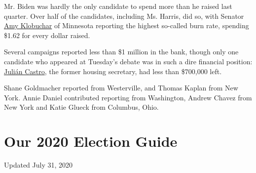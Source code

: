 Mr. Biden was hardly the only candidate to spend more than he raised
last quarter. Over half of the candidates, including Ms. Harris, did so,
with Senator
\href{https://www.nytimes.com/interactive/2020/us/elections/amy-klobuchar.html}{Amy
Klobuchar} of Minnesota reporting the highest so-called burn rate,
spending \$1.62 for every dollar raised.

Several campaigns reported less than \$1 million in the bank, though
only one candidate who appeared at Tuesday's debate was in such a dire
financial position:
\href{https://www.nytimes.com/interactive/2020/us/elections/julian-castro.html}{Julián
Castro}, the former housing secretary, had less than \$700,000 left.

Shane Goldmacher reported from Westerville, and Thomas Kaplan from New
York. Annie Daniel contributed reporting from Washington, Andrew Chavez
from New York and Katie Glueck from Columbus, Ohio.

\hypertarget{our-2020-election-guide}{%
\section{Our 2020 Election Guide}\label{our-2020-election-guide}}

Updated July 31, 2020

